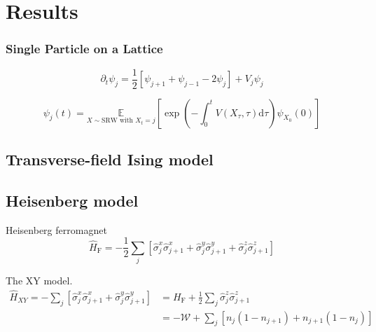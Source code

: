 
\chapter{Results}
\label{chapter6}

\ifpdf
\graphicspath{{Chapter5/Figs/Raster/}{Chapter5/Figs/PDF/}{Chapter5/Figs/}}
\else
\graphicspath{{Chapter5/Figs/Vector/}{Chapter5/Figs/}}
\fi

\subsection{Single Particle on a Lattice}
\begin{equation}
	\partial_{t} \psi_{j}=\frac{1}{2}\left[\psi_{j+1}+\psi_{j-1}-2 \psi_{j}\right]+V_{j} \psi_{j}
\end{equation}

\begin{equation}
	\psi_{j}(t)=\underset{X \sim \mathrm{SRW} \text { with } X_{t}=j}{\mathbb{E}} \left[\exp \left(-\int_{0}^{t}  V\left(X_{\tau}, \tau\right) \mathrm{d} \tau \right) \psi_{X_{0}}(0)\right]
\end{equation}

\section{Transverse-field Ising model}
\label{sec:res-im}

\section{Heisenberg model}
\label{sec:res-hm}

Heisenberg ferromagnet
\begin{equation}
	\hat H_{\mathrm{F}}=-\frac{1}{2} \sum_{j}\left[\hat{\sigma}_{j}^{x} \hat{\sigma}_{j+1}^{x}+\hat{\sigma}_{j}^{y} \hat{\sigma}_{j+1}^{y}+\hat{\sigma}_{j}^{z} \hat{\sigma}_{j+1}^{z}\right]
\end{equation}

The XY model.
\begin{equation}
	\begin{aligned} 
		\hat H_{X Y}=-\sum_{j}\left[\hat{\sigma}_{j}^{x} \hat{\sigma}_{j+1}^{x}+\hat{\sigma}_{j}^{y} \hat{\sigma}_{j+1}^{y}\right] &=H_{\mathrm{F}}+\frac{1}{2} \sum_{j} \hat{\sigma}_{j}^{z} \hat{\sigma}_{j+1}^{z} \\ 						&=-\mathcal{W}+\sum_{j}\left[n_{j}\left(1-n_{j+1}\right)+n_{j+1}\left(1-n_{j}\right)\right] 
	\end{aligned}
\end{equation}

